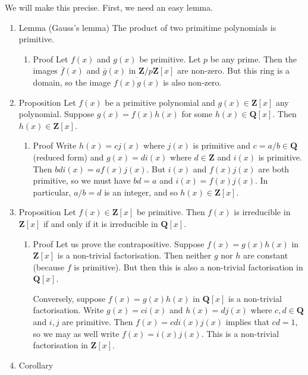 \documentclass[11pt]{article}
\begin{document}
We will make this precise.
First, we need an easy lemma.
\begin{enumerate}
\item Lemma (Gauss's lemma)
\label{sec:org9516edd}
The product of two primitime polynomials is primitive.
\begin{enumerate}
\item Proof
\label{sec:org5326119}
Let \(f(x)\) and \(g(x)\) be primitive.
Let \(p\) be any prime.
Then the images \(\overline f(x)\) and \(\overline g(x)\) in \(\mathbf{Z}/p \mathbf{Z} [x]\) are non-zero.
But this ring is a domain, so the image \(\overline {f(x)g(x)}\) is also non-zero.
\end{enumerate}
\item Proposition
\label{sec:org9eec051}
Let \(f(x)\) be a primitive polynomial and \(g(x) \in \mathbf{Z}[x]\) any polynomial.
Suppose \(g(x) = f(x) h(x)\) for some \(h(x) \in \mathbf{Q}[x]\).
Then \(h(x) \in \mathbf{Z}[x]\).
\begin{enumerate}
\item Proof
\label{sec:org82aa6c1}
Write \(h(x) = c j(x)\) where \(j(x)\) is primitive and \(c = a/b \in \mathbf{Q}\) (reduced form) and \(g(x) = d i(x)\) where \(d \in \mathbf{Z}\) and \(i(x)\) is primitive.
Then \(bd i(x) = a f(x) j(x)\).
But \(i(x)\) and \(f(x)j(x)\) are both primitive, so we must have \(bd = a\) and \(i(x) = f(x)j(x)\).
In particular, \(a/b = d\) is an integer, and so \(h(x) \in \mathbf{Z}[x]\).
\end{enumerate}
\item Proposition
\label{sec:org0142e89}
Let \(f(x) \in \mathbf{Z}[x]\) be primitive.
Then \(f(x)\) is irreducible in \(\mathbf{Z}[x]\) if and only if it is irreducible in \(\mathbf{Q}[x]\).
\begin{enumerate}
\item Proof
\label{sec:orgf7dc0ff}
Let us prove the contrapositive.
Suppose \(f(x) = g(x) h(x)\) in \(\mathbf{Z}[x]\) is a non-trivial factorisation.
Then neither \(g\) nor \(h\) are constant (because \(f\) is primitive).
But then this is also a non-trivial factorisation in \(\mathbf{Q}[x]\).

Conversely, suppose \(f(x) = g(x) h(x)\) in \(\mathbf{Q}[x]\) is a non-trivial factorisation.
Write \(g(x) = c i(x)\) and \(h(x) = d j(x)\) where \(c,d \in \mathbf{Q}\) and \(i,j\) are primitive.
Then \(f(x) = cd i(x)j(x)\) implies that \(cd = 1\), so we may as well write
\(f(x) = i(x) j(x)\).
This is a non-trivial factorisation in \(\mathbf{Z}[x]\).
\end{enumerate}
\item Corollary
\label{sec:orgc75c652}


\end{enumerate}
\end{document}
